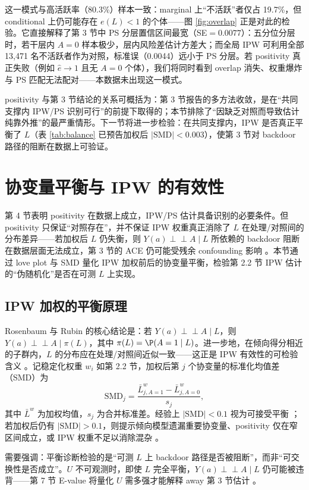 \documentclass[12pt,a4paper]{article}
\newcommand{\indep}{\perp\!\!\!\perp}
\begin{document}
这一模式与高活跃率（80.3\%）样本一致：marginal 上“不活跃”者仅占 19.7\%，但 conditional 上仍可能存在 $e(L)<1$ 的个体——图 \ref{fig:overlap} 正是对此的检验。它直接解释了第 3 节中 PS 分层置信区间最宽（SE$=0.0077$）：五分位分层时，若干层内 $A=0$ 样本极少，层内风险差估计方差大；而全局 IPW 可利用全部 13{,}471 名不活跃者作为对照，标准误（0.0044）远小于 PS 分层。若 positivity 真正失败（例如 $\hat e\to 1$ 且无 $A=0$ 个体），我们将同时看到 overlap 消失、权重爆炸与 PS 匹配无法配对——本数据未出现这一模式。

positivity 与第 3 节结论的关系可概括为：第 3 节报告的多方法收敛，是在“共同支撑内 IPW/PS 识别可行”的前提下取得的；本节排除了“因缺乏对照而导致估计纯靠外推”的最严重情形。下一节将进一步检验：在共同支撑内，IPW 是否真正平衡了 $L$（表 \ref{tab:balance} 已预告加权后 $|\mathrm{SMD}|<0.003$），使第 3 节对 backdoor 路径的阻断在数据上可验证。

\section{协变量平衡与 IPW 的有效性}

第 4 节表明 positivity 在数据上成立，IPW/PS 估计具备识别的必要条件。但 positivity 只保证“对照存在”，并不保证 IPW 权重真正消除了 $L$ 在处理/对照间的分布差异——若加权后 $L$ 仍失衡，则 $Y(a)\indep A\mid L$ 所依赖的 backdoor 阻断在数据层面无法成立，第 3 节的 ACE 仍可能受残余 confounding 影响 \cite{rosenbaum1983central,chen2024iptw}。本节通过 love plot 与 SMD 量化 IPW 加权前后的协变量平衡，检验第 2.2 节 IPW 估计的“伪随机化”是否在可测 $L$ 上实现。

\subsection{IPW 加权的平衡原理}

Rosenbaum 与 Rubin \cite{rosenbaum1983central} 的核心结论是：若 $Y(a)\indep A\mid L$，则 $Y(a)\indep A\mid \pi(L)$，其中 $\pi(L)=\P(A=1\mid L)$。进一步地，在倾向得分相近的子群内，$L$ 的分布应在处理/对照间近似一致——这正是 IPW 有效性的可检验含义 \cite{chen2024iptw}。记稳定化权重 $w_i$ 如第 2.2 节，加权后第 $j$ 个协变量的标准化均值差（SMD）为
\[
\mathrm{SMD}_j=\frac{\bar L_{j,A=1}^{w}-\bar L_{j,A=0}^{w}}{s_j},
\]
其中 $\bar L^w$ 为加权均值，$s_j$ 为合并标准差。经验上 $|\mathrm{SMD}|<0.1$ 视为可接受平衡 \cite{chen2024iptw}；若加权后仍有 $|\mathrm{SMD}|>0.1$，则提示倾向模型遗漏重要协变量、positivity 仅在窄区间成立，或 IPW 权重不足以消除混杂 \cite{chen2024iptw,hernan2024whatif}。

需要强调：平衡诊断检验的是“可测 $L$ 上 backdoor 路径是否被阻断”，而非“可交换性是否成立”。$U$ 不可观测时，即使 $L$ 完全平衡，$Y(a)\indep A\mid L$ 仍可能被违背——第 7 节 E-value 将量化 $U$ 需多强才能解释 away 第 3 节估计 \cite{vanderweele2017evalue}。
\end{document}
